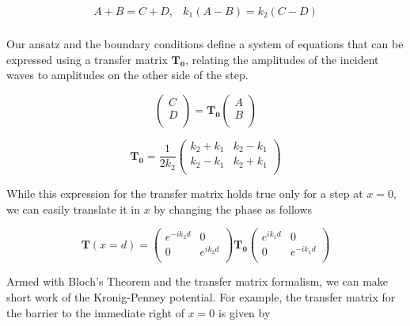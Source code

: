 \begin{equation}
	\begin{array}{cc}
		A + B = C + D, & k_{1}(A - B) = k_{2}(C - D) \\
	\end{array}
\end{equation}

Our ansatz and the boundary conditions define a system of equations that can be expressed using a transfer matrix $\mathbf{T_{0}}$, relating the amplitudes of the incident waves to amplitudes on the other side of the step.

\begin{equation}
	\begin{pmatrix}
		C \\
		D \\
	\end{pmatrix} =
	\mathbf{T_{0}}
	\begin{pmatrix}
		A \\
		B \\
	\end{pmatrix}
\end{equation}

\begin{equation}
\mathbf{T_{0}} = \frac{1}{2 k_{2}}
	\begin{pmatrix}
		k_{2} + k_{1} & k_{2} - k_{1} \\
		k_{2} - k_{1} & k_{2} + k_{1} \\
	\end{pmatrix}
\end{equation}


While this expression for the transfer matrix holds true only for a step at $x=0$, we can easily translate it in $x$ by changing the phase as follows

\begin{equation}
\mathbf{T}(x = d) = 
	\begin{pmatrix}
		e^{-i k_{2} d} & 0 \\
		0 & e^{i k_{2} d}  \\
	\end{pmatrix}
	\mathbf{T_{0}}
	\begin{pmatrix}
		e^{i k_{1} d} & 0 \\
		0 & e^{-i k_{1} d}  \\
	\end{pmatrix}
\end{equation}

Armed with Bloch's Theorem and the transfer matrix formalism, we can make short work of the Kronig-Penney potential. For example, the transfer matrix for the barrier to the immediate right of $x = 0$ is given by

